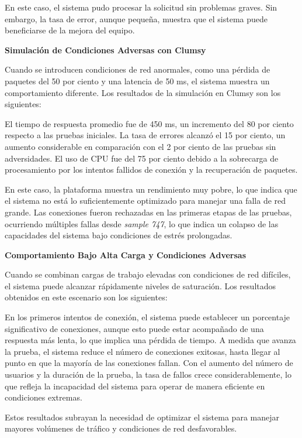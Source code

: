 \documentclass{article}
\begin{document}
En este caso, el sistema pudo procesar la solicitud sin problemas graves. Sin embargo, la tasa de error, aunque pequeña, muestra que el sistema puede beneficiarse de la mejora del equipo.

\textbf{Simulación de Condiciones Adversas con Clumsy}

Cuando se introducen condiciones de red anormales, como una pérdida de paquetes del 50 por ciento y una latencia de 50 ms, el sistema muestra un comportamiento diferente. Los resultados de la simulación en Clumsy son los siguientes: 

El tiempo de respuesta promedio fue de 450 ms, un incremento del 80 por ciento respecto a las pruebas iniciales. La tasa de errores alcanzó el 15 por ciento, un aumento considerable en comparación con el 2 por ciento de las pruebas sin adversidades. El uso de CPU fue del 75 por ciento debido a la sobrecarga de procesamiento por los intentos fallidos de conexión y la recuperación de paquetes.

En este caso, la plataforma muestra un rendimiento muy pobre, lo que indica que el sistema no está lo suficientemente optimizado para manejar una falla de red grande. Las conexiones fueron rechazadas en las primeras etapas de las pruebas, ocurriendo múltiples fallas desde \textit{sample 747}, lo que indica un colapso de las capacidades del sistema bajo condiciones de estrés prolongadas.

\textbf{Comportamiento Bajo Alta Carga y Condiciones Adversas}

Cuando se combinan cargas de trabajo elevadas con condiciones de red difíciles, el sistema puede alcanzar rápidamente niveles de saturación. Los resultados obtenidos en este escenario son los siguientes:

En los primeros intentos de conexión, el sistema puede establecer un porcentaje significativo de conexiones, aunque esto puede estar acompañado de una respuesta más lenta, lo que implica una pérdida de tiempo. A medida que avanza la prueba, el sistema reduce el número de conexiones exitosas, hasta llegar al punto en que la mayoría de las conexiones fallan. Con el aumento del número de usuarios y la duración de la prueba, la tasa de fallos crece considerablemente, lo que refleja la incapacidad del sistema para operar de manera eficiente en condiciones extremas.

Estos resultados subrayan la necesidad de optimizar el sistema para manejar mayores volúmenes de tráfico y condiciones de red desfavorables.
\end{document}
